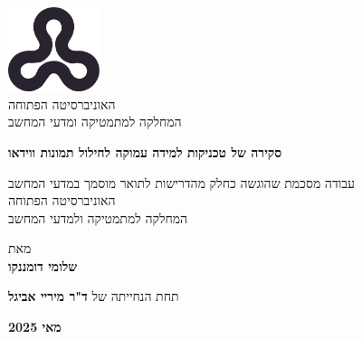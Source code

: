 \begin{hebrew}
\begin{RTL}

    \begin{titlepage}
        \begin{center}
            \vspace*{1cm}
            
            \includegraphics[width=0.2\textwidth]{images/ou_logo.png}\\
            האוניברסיטה הפתוחה\\
            המחלקה למתמטיקה ומדעי המחשב
            
            \vspace{2cm}
            
            {\Large \textbf{סקירה של טכניקות למידה עמוקה לחילול תמונות ווידאו}}
            \vspace{1.5cm}
            
            עבודה מסכמת שהוגשה כחלק מהדרישות לתואר מוסמך במדעי המחשב\\
            האוניברסיטה הפתוחה\\
            המחלקה למתמטיקה ולמדעי המחשב
            
            \vspace{1cm}
            
            מאת \\
            \textbf{שלומי דומננקו}
            
            \vspace{1cm}
            
            תחת הנחייתה של \textbf{ד"ר מיריי אביגל}
            
            \vfill
            
            \textbf{מאי 2025}
        \end{center}
    \end{titlepage}

\end{RTL}
\end{hebrew}